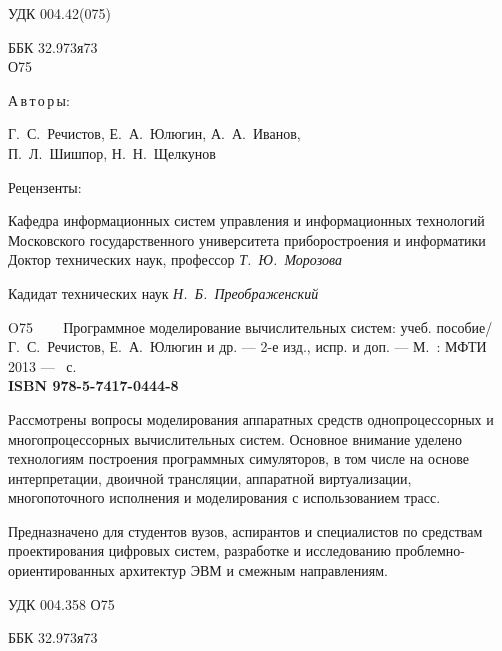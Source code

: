 \thispagestyle{empty}
\begingroup
\small
\begin{flushleft}
УДК 004.42(075)

ББК 32.973я73\\
\enskip \enskip \enskip \enskip \enskip О75    
\end{flushleft}
\begin{center}
\begin{normalsize}
\textsf{{А\,в\,т\,о\,р\,ы}:}
\end{normalsize}
Г.~С.~Речистов, Е.~А.~Юлюгин, А.~А.~Иванов, \\
П.~Л.~Шишпор, Н.~Н.~Щелкунов\\
\end {center}

\begin{center}
Рецензенты:

Кафедра информационных систем управления и информационных технологий Московского государственного университета приборостроения и информатики\\
Доктор технических наук, профессор \textit{Т.~Ю.~Морозова}

Кадидат технических наук \textit{Н.~Б.~Преображенский }

\end{center}

\noindent O75 ~~~ {Программное моделирование вычислительных систем}: учеб. пособие/ \\Г.~С.~Речистов, Е.~А.~Юлюгин и др. --- 2-е изд., испр. и доп. --- М.~: МФТИ 2013 --- \pageref{page:lastpage}~с.\\
\textbf{ISBN 978-5-7417-0444-8}
\medskip

Рассмотрены вопросы моделирования аппаратных средств однопроцессорных и многопроцессорных вычислительных систем. Основное внимание уделено технологиям построения программных симуляторов, в том числе на основе интерпретации, двоичной трансляции, аппаратной виртуализации, многопоточного исполнения и моделирования с использованием трасс.

Предназначено для студентов вузов, аспирантов и специалистов по средствам проектирования цифровых систем, разработке и исследованию проблемно-ориентированных архитектур ЭВМ и смежным направлениям. 

{\raggedleft УДК 004.358 О75 \par}

{\raggedleft ББК 32.973я73 \par}
\vfill

